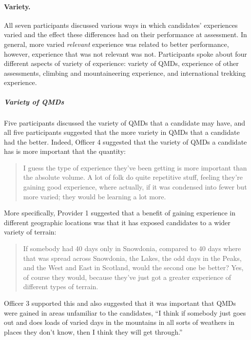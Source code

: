\documentclass[
  12pt,
  a4paper,
]{book}
\begin{document}
\hypertarget{variety.}{%
\paragraph{Variety.}\label{variety.}}

All seven participants discussed various ways in which candidates' experiences varied and the effect these differences had on their performance at assessment. In general, more varied \emph{relevant} experience was related to better performance, however, experience that was not relevant was not. Participants spoke about four different aspects of variety of experience: variety of QMDs, experience of other assessments, climbing and mountaineering experience, and international trekking experience.

\hypertarget{variety-of-qmds}{%
\subparagraph{Variety of QMDs}\label{variety-of-qmds}}

Five participants discussed the variety of QMDs that a candidate may have, and all five participants suggested that the more variety in QMDs that a candidate had the better. Indeed, Officer 4 suggested that the variety of QMDs a candidate has is more important that the quantity:

\begin{quote}
I guess the type of experience they've been getting is more important than the absolute volume. A lot of folk do quite repetitive stuff, feeling they're gaining good experience, where actually, if it was condensed into fewer but more varied; they would be learning a lot more.
\end{quote}

More specifically, Provider 1 suggested that a benefit of gaining experience in different geographic locations was that it has exposed candidates to a wider variety of terrain:

\begin{quote}
If somebody had 40 days only in Snowdonia, compared to 40 days where that was spread across Snowdonia, the Lakes, the odd days in the Peaks, and the West and East in Scotland, would the second one be better? Yes, of course they would, because they've just got a greater experience of different types of terrain.
\end{quote}

Officer 3 supported this and also suggested that it was important that QMDs were gained in areas unfamiliar to the candidates, ``I think if somebody just goes out and does loads of varied days in the mountains in all sorts of weathers in places they don't know, then I think they will get through.''
\end{document}
